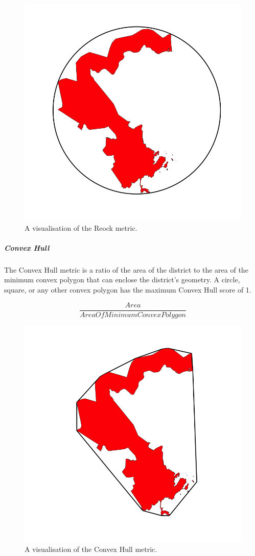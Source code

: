 \documentclass[]{article}
\let\oldsubparagraph\subparagraph
\renewcommand{\subparagraph}[1]{\oldsubparagraph{#1}\mbox{}}
\begin{document}
\begin{figure}
\centering
\includegraphics{img/reock.png}
\caption{A visualisation of the Reock metric.}
\end{figure}

\hypertarget{convex-hull}{%
\subparagraph{Convex Hull}\label{convex-hull}}

The Convex Hull metric is a ratio of the area of the district to the
area of the minimum convex polygon that can enclose the district's
geometry. A circle, square, or any other convex polygon has the maximum
Convex Hull score of 1.

\[\frac{Area}{AreaOfMinimumConvexPolygon}\]

\begin{figure}
\centering
\includegraphics{img/ch.png}
\caption{A visualisation of the Convex Hull metric.}
\end{figure}
\end{document}
